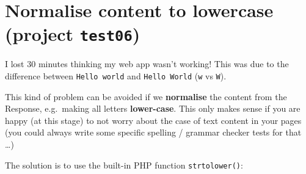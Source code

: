 \documentclass[a4paperpaper,openright]{book}
\newenvironment{Shaded}{}{}
\newcommand{\CommentTok}[1]{\textcolor[rgb]{0.38,0.63,0.69}{\textit{#1}}}
\newcommand{\FunctionTok}[1]{\textcolor[rgb]{0.02,0.16,0.49}{#1}}
\newcommand{\KeywordTok}[1]{\textcolor[rgb]{0.00,0.44,0.13}{\textbf{#1}}}
\newcommand{\NormalTok}[1]{#1}
\newcommand{\OtherTok}[1]{\textcolor[rgb]{0.00,0.44,0.13}{#1}}
\newcommand{\StringTok}[1]{\textcolor[rgb]{0.25,0.44,0.63}{#1}}
\begin{document}
\hypertarget{normalise-content-to-lowercase-project-test06}{%
\section{\texorpdfstring{Normalise content to lowercase (project
\texttt{test06})}{Normalise content to lowercase (project test06)}}\label{normalise-content-to-lowercase-project-test06}}

I lost 30 minutes thinking my web app wasn't working! This was due to
the difference between \texttt{Hello\ world} and \texttt{Hello\ World}
(\texttt{w} vs \texttt{W}).

This kind of problem can be avoided if we \textbf{normalise} the content
from the Response, e.g.~making all letters \textbf{lower-case}. This
only makes sense if you are happy (at this stage) to not worry about the
case of text content in your pages (you could always write some specific
spelling / grammar checker tests for that \ldots{})

The solution is to use the built-in PHP function \texttt{strtolower()}:

\begin{Shaded}
\end{Shaded}
\end{document}
